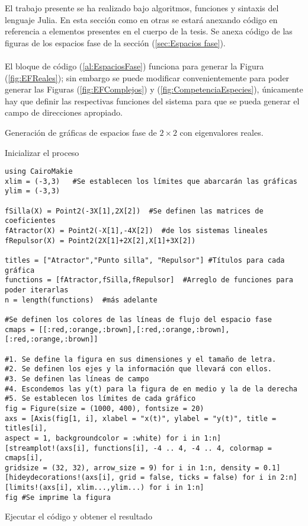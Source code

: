 El trabajo presente se ha realizado bajo algoritmos, funciones y sintaxis del lenguaje Julia. En esta sección como en otras se estará anexando código en referencia a elementos presentes en el cuerpo de la tesis. Se anexa código de las figuras de los espacios fase de la sección (\ref{sec:Espacios fase}).\\
\\
El bloque de código (\ref{al:EspaciosFase}) funciona para generar la Figura (\ref{fig:EFReales}); sin embargo se puede modificar convenientemente para poder generar las Figuras (\ref{fig:EFComplejos}) y (\ref{fig:CompetenciaEspecies}), únicamente hay que definir las respectivas funciones del sistema para que se pueda generar el campo de direcciones apropiado.
\begin{algorithm}
	\caption{Generación de gráficas de espacios fase de $2\times 2$ con eigenvalores reales.}
	\label{al:EspaciosFase}
	Inicializar el proceso\;	
	\begin{verbatim}
using CairoMakie
xlim = (-3,3)	#Se establecen los límites que abarcarán las gráficas
ylim = (-3,3)

fSilla(X) = Point2(-3X[1],2X[2])  #Se definen las matrices de coeficientes
fAtractor(X) = Point2(-X[1],-4X[2])  #de los sistemas lineales
fRepulsor(X) = Point2(2X[1]+2X[2],X[1]+3X[2])

titles = ["Atractor","Punto silla", "Repulsor"] #Títulos para cada gráfica
functions = [fAtractor,fSilla,fRepulsor]  #Arreglo de funciones para poder iterarlas
n = length(functions)  #más adelante

#Se definen los colores de las líneas de flujo del espacio fase
cmaps = [[:red,:orange,:brown],[:red,:orange,:brown],[:red,:orange,:brown]]

#1. Se define la figura en sus dimensiones y el tamaño de letra.
#2. Se definen los ejes y la información que llevará con ellos. 
#3. Se definen las líneas de campo
#4. Escondemos las y(t) para la figura de en medio y la de la derecha
#5. Se establecen los límites de cada gráfico
fig = Figure(size = (1000, 400), fontsize = 20)
axs = [Axis(fig[1, i], xlabel = "x(t)", ylabel = "y(t)", title = titles[i],
aspect = 1, backgroundcolor = :white) for i in 1:n]
[streamplot!(axs[i], functions[i], -4 .. 4, -4 .. 4, colormap = cmaps[i],
gridsize = (32, 32), arrow_size = 9) for i in 1:n, density = 0.1]
[hideydecorations!(axs[i], grid = false, ticks = false) for i in 2:n]
[limits!(axs[i], xlim...,ylim...) for i in 1:n]
fig	#Se imprime la figura
	\end{verbatim}
	 Ejecutar el código y obtener el resultado\;
\end{algorithm}
